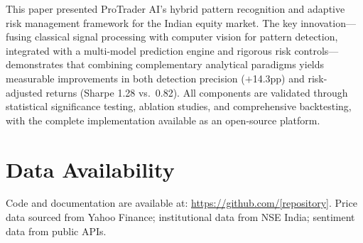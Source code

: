\documentclass[12pt,a4paper]{article}
\begin{document}
This paper presented ProTrader AI's hybrid pattern recognition and adaptive risk management framework for the Indian equity market. The key innovation---fusing classical signal processing with computer vision for pattern detection, integrated with a multi-model prediction engine and rigorous risk controls---demonstrates that combining complementary analytical paradigms yields measurable improvements in both detection precision ($+$14.3pp) and risk-adjusted returns (Sharpe 1.28 vs.\ 0.82). All components are validated through statistical significance testing, ablation studies, and comprehensive backtesting, with the complete implementation available as an open-source platform.

\section*{Data Availability}

Code and documentation are available at: \url{https://github.com/[repository]}. Price data sourced from Yahoo Finance; institutional data from NSE India; sentiment data from public APIs.
\end{document}
